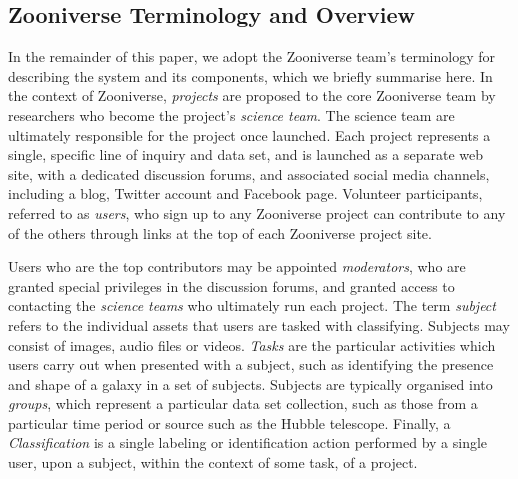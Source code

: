 \documentclass{sigchi}
\begin{document}
\subsection{Zooniverse Terminology and Overview}
In the remainder of this paper, we adopt the Zooniverse team's terminology for describing the system and its components, which we briefly summarise here. In the context of Zooniverse, \emph{projects} are proposed to the core Zooniverse team by researchers who become the project's \emph{science team}.  The science team are ultimately responsible for the project once launched.  Each project represents a single, specific line of inquiry and data set, and is launched as a separate web site, with a dedicated discussion forums,  and associated social media channels, including a blog, Twitter account and Facebook page.  Volunteer participants, referred to as \emph{users}, who sign up to any Zooniverse project can contribute to any of the others through links at the top of each Zooniverse project site.  

Users who are the top contributors may be appointed \emph{moderators}, who are granted special privileges in the discussion forums, and granted access to contacting the \emph{science teams} who ultimately run each project. The term \emph{subject} refers to the individual assets that users are tasked with classifying.  Subjects may consist of images, audio files or videos. \emph{Tasks} are the particular activities which users carry out when presented with a subject, such as identifying the presence and shape of a galaxy in a set of subjects. Subjects are typically organised into \emph{groups}, which represent a particular data set collection, such as those from a particular time period or source such as the Hubble telescope.  Finally, a \emph{Classification} is a single labeling or identification action performed by a single user, upon a subject, within the context of some task, of a project. 

\end{document}
